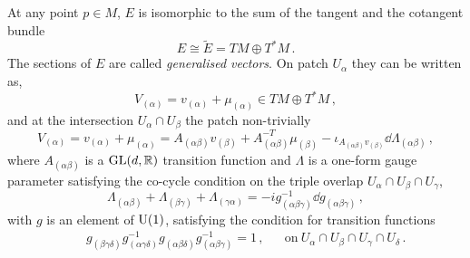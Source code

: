 \documentclass[debug]{phd}
\begin{document}
					At any point $p\in M$, $E$ is isomorphic to the sum of the tangent and the cotangent bundle
							\begin{equation}
								E \cong \tilde{E} = TM \oplus T^*M \, .
							\end{equation}
					The sections of $E$ are called \emph{generalised vectors}. 
					On patch $U_\alpha$ they can be written as,
							\begin{equation}
								V_{(\alpha)} = v_{(\alpha)} + \mu_{(\alpha)} \in TM \oplus T^*M\, , 
							\end{equation}
					and at the intersection $U_\alpha \cap U_\beta$ the patch non-trivially 
							\begin{equation}\label{patchV1}
								V_{(\alpha)} = v_{(\alpha)} + \mu_{(\alpha)} = A_{(\alpha\beta)} v_{(\beta)} + A^{-T}_{(\alpha\beta)} \mu_{(\beta)} - \iota_{A_{(\alpha\beta)} v_{(\beta)}} \dd \Lambda_{(\alpha\beta)} \, ,
							\end{equation}
where $ A_{(\alpha\beta)}$ is a $\mathrm{GL}(d, \mathbb{R})$ transition function and $\Lambda$ is a one-form gauge parameter satisfying the co-cycle condition on the triple overlap 
$U_\alpha \cap U_\beta \cap U_\gamma$,
								\begin{equation}\label{cycliccond}
									\Lambda_{(\alpha\beta)} + \Lambda_{(\beta\gamma)} + \Lambda_{(\gamma\alpha)} = - i g^{-1}_{(\alpha\beta\gamma)} \dd g_{(\alpha\beta\gamma)}\, ,
								\end{equation}
						with $g$ is an element of $\mathrm{U}(1)$, satisfying the condition for transition functions
								\begin{align}
									& & g_{(\beta\gamma\delta)} g^{-1}_{(\alpha\gamma\delta)} g_{(\alpha\beta\delta)} g^{-1}_{(\alpha\beta\gamma)} = 1\, , & & \mbox{on}\ U_\alpha \cap U_\beta \cap U_\gamma \cap U_\delta\, .	
								\end{align}
\end{document}
